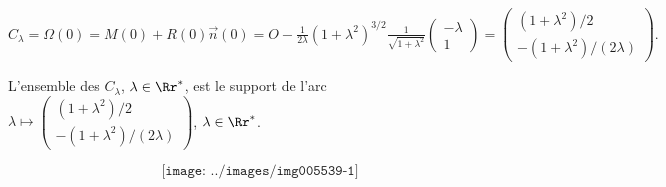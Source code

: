 {{\begin{center}
$C_\lambda=\Omega(0)=M(0)+R(0)\overrightarrow{n}(0)=O-\frac{1}{2\lambda}(1+\lambda^2)^{3/2}\frac{1}{\sqrt{1+\lambda^2}}\left(
\begin{array}{c}
-\lambda\\
1
\end{array}
\right)=\left(
\begin{array}{c}
(1+\lambda^2)/2\\
-(1+\lambda^2)/(2\lambda)
\end{array}
\right).$
\end{center}
L'ensemble des $C_\lambda$, $\lambda\in\Rr^*$, est le support de l'arc $\lambda\mapsto\left(
\begin{array}{c}
(1+\lambda^2)/2\\
-(1+\lambda^2)/(2\lambda)
\end{array}
\right)$, $\lambda\in\Rr^*$.

$$\texttt{[image: ../images/img005539-1]}$$}
}